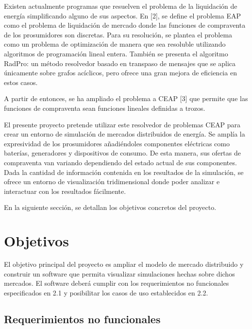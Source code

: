 \documentclass[12pt,a4paper,openright,oneside]{article}
\numberwithin{equation}{section}
\theoremstyle{definition}
\begin{document}
Existen actualmente programas que resuelven el problema de la liquidación de energía simplificando alguno de sus aspectos. En [2], se define el problema EAP como el problema de liquidación de mercado donde las funciones de compraventa de los prosumidores son discretas. Para su resolución, se plantea el problema como un problema de optimización de manera que sea resoluble utilizando algoritmos de programación lineal entera. También se presenta el algoritmo RadPro: un método resolvedor basado en transpaso de mensajes que se aplica únicamente sobre grafos acíclicos, pero ofrece una gran mejora de eficiencia en estos casos. 

A partir de entonces, se ha ampliado el problema a CEAP [3] que permite que las funciones de compraventa sean funciones lineales definidas a trozos.

El presente proyecto pretende utilizar este resolvedor de problemas CEAP para crear un entorno de simulación de mercados distribuidos de energía. Se amplía la expresividad de los prosumidores añadiéndoles componentes eléctricas como baterías, generadores y dispositivos de consumo. De esta manera, sus ofertas de compraventa van variando dependiendo del estado actual de sus componentes. Dada la cantidad de información contenida en los resultados de la simulación, se ofrece un entorno de visualización tridimensional donde poder analizar e interactuar con los resultados fácilmente. 

En la siguiente sección, se detallan los objetivos concretos del proyecto.

\newpage







\section{Objetivos}

El objetivo principal del proyecto es ampliar el modelo de mercado distribuido y construir un software que permita visualizar simulaciones hechas sobre dichos mercados.
El software deberá cumplir con los requerimientos no funcionales especificados en 2.1 y posibilitar los casos de uso establecidos en 2.2.

\subsection{Requerimientos no funcionales}
\end{document}
